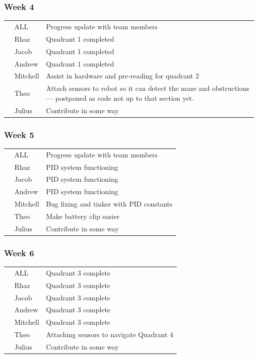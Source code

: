 \documentclass[paper=a4, fontsize=11pt]{scrartcl} %
\def\checkmark{\tikz\fill[scale=0.4] (0,.35) -- (.25,0) -- (1,.7) -- (.25,.15) -- cycle;}
\def\scalecheck{\resizebox{\widthof{\checkmark}*\ratio{\widthof{x}}{\widthof{\normalsize x}}}{!}{\checkmark}}
\numberwithin{equation}{section} %
\numberwithin{figure}{section} %
\begin{document}
\subsubsection*{Week 4}
\begin{tabularx}{\textwidth}{clX}
  \scalecheck & ALL      & Progress update with team members\\
  \scalecheck & Rhaz     & Quadrant 1 completed\\
  \scalecheck & Jacob    & Quadrant 1 completed\\
  \scalecheck & Andrew   & Quadrant 1 completed\\
  \scalecheck & Mitchell & Assist in hardware and pre-reading for quadrant 2\\
              & Theo     & Attach sensors to robot so it can detect the maze and obstructions --- postponed as code not up to that section yet.\\
              & Julius   & Contribute in some way\\
\end{tabularx}
\subsubsection*{Week 5}
\begin{tabularx}{\textwidth}{clX}
  \scalecheck & ALL      & Progress update with team members\\
  \scalecheck & Rhaz     & PID system functioning\\
  \scalecheck & Jacob    & PID system functioning\\
  \scalecheck & Andrew   & PID system functioning\\
  \scalecheck & Mitchell & Bug fixing and tinker with PID constants\\
  \scalecheck & Theo     & Make battery clip easier\\
              & Julius   & Contribute in some way\\
\end{tabularx}
\subsubsection*{Week 6}
\begin{tabularx}{\textwidth}{clX}
              & ALL      & Quadrant 3 complete\\
              & Rhaz     & Quadrant 3 complete\\
              & Jacob    & Quadrant 3 complete\\ 
              & Andrew   & Quadrant 3 complete\\ 
              & Mitchell & Quadrant 3 complete\\ 
  \scalecheck & Theo     & Attaching sensors to navigate Quadrant 4\\
              & Julius   & Contribute in some way\\
\end{tabularx}
\end{document}
